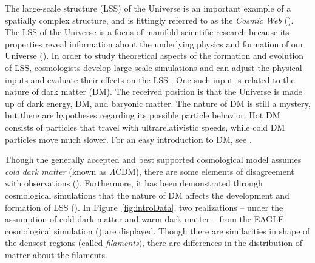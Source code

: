 \documentclass[12pt]{article}
\newcommand{\figref}[1]{Figure~\ref{#1}}
\begin{document}
The large-scale structure (LSS) of the Universe is an important example of a spatially complex structure, and is fittingly referred to as the \emph{Cosmic Web} (\cite{bond1996filaments,springel2006large}). The LSS of the Universe is a focus of manifold scientific research because its properties reveal information about the underlying physics and formation of our Universe (\cite{davis1985evolution}). In order to study theoretical aspects of the formation and evolution of LSS, cosmologists develop large-scale simulations and can adjust the physical inputs and evaluate their effects on the LSS \citep{cooray2002halo,centrella1983three,doroshkevich1980two,schaye2015eagle}. One such input is related to the nature of dark matter (DM). The received position is that the Universe is made up of dark energy, DM, and baryonic matter. The nature of DM is still a mystery, but there are hypotheses regarding its possible particle behavior. Hot DM consists of particles that travel with ultrarelativistic speeds, while cold DM particles move much slower. For an easy introduction to DM, see \cite[p. 61-63]{HilbeEtAl2014}.  

Though the generally accepted and best supported cosmological model assumes \emph{cold dark matter} (known as $\Lambda$CDM), there are some elements of disagreement with observations (\cite{SchneiderEtAl2012}). Furthermore, it has been demonstrated through cosmological simulations that the nature of DM affects the development and formation of LSS (\cite{SchneiderEtAl2012}).  In \figref{fig:introData}, two realizations -- under the assumption of cold dark matter and warm dark matter -- from the EAGLE cosmological simulation (\cite{schaye2015eagle}) are displayed. Though there are similarities in shape of the densest regions (called \emph{filaments}), there are differences in the distribution of matter about the filaments.  
\end{document}
